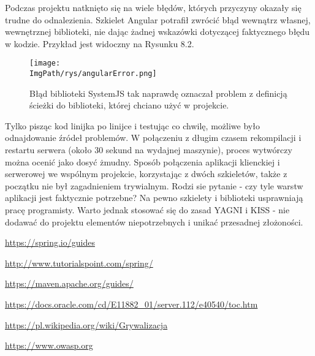 \documentclass[a4paper,12pt,twoside,openany]{report}
\newcommand{\ImgPath}{.}
\begin{document}
Podczas projektu natknięto się na wiele błędów, których przyczyny okazały się trudne do odnalezienia. Szkielet Angular potrafił zwrócić błąd wewnątrz własnej, wewnętrznej biblioteki, nie dając żadnej wskazówki dotyczącej faktycznego błędu w kodzie. Przykład jest widoczny na Rysunku 8.2.
				\begin{figure}[!htbp]
					\begin{center}
						\centering
						\texttt{[image: \\ImgPath/rys/angularError.png]}
					\end{center}
					\caption{Błąd biblioteki SystemJS tak naprawdę oznaczał problem z definicją ścieżki do biblioteki, której chciano użyć w projekcie.}
					\label{UMLTS}
				\end{figure}
Tylko pisząc kod linijka po linijce i testując co chwilę, możliwe było odnajdowanie źródeł problemów. W połączeniu z długim czasem rekompilacji i restartu serwera (około 30 sekund na wydajnej maszynie), proces wytwórczy można ocenić jako dosyć żmudny. Sposób połączenia aplikacji klienckiej i serwerowej we wspólnym projekcie, korzystając z dwóch szkieletów, także z początku nie był zagadnieniem trywialnym. Rodzi sie pytanie - czy tyle warstw aplikacji jest faktycznie potrzebne? Na pewno szkielety i biblioteki usprawniają pracę programisty. Warto jednak stosować się do zasad YAGNI i KISS - nie dodawać do projektu elementów niepotrzebnych i unikać przesadnej złożoności.


\begin{thebibliography}{99}

\newline \url{https://spring.io/guides}

\newline \url{http://www.tutorialspoint.com/spring/}

\newline \url{https://maven.apache.org/guides/}

\newline \url{https://docs.oracle.com/cd/E11882_01/server.112/e40540/toc.htm}


\newline \url{https://pl.wikipedia.org/wiki/Grywalizacja}

\newline \url{https://www.owasp.org}


\end{thebibliography}

\zakonczenie  %
\end{document}
